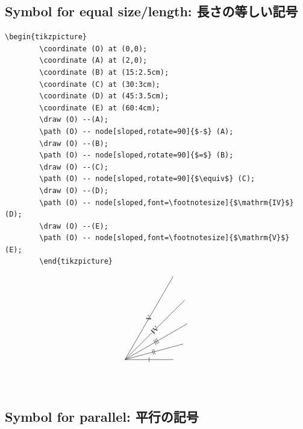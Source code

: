 \documentclass[lualatex]{jlreq}
\begin{document}
\subsection{Symbol for equal size/length: 長さの等しい記号}

\begin{minipage}{0.68 \textwidth}
    \begin{lstlisting}[language={[LaTeX] TeX},
        firstnumber=1,breaklines=true,gobble=8]
        \begin{tikzpicture}
        \coordinate (O) at (0,0);
        \coordinate (A) at (2,0);
        \coordinate (B) at (15:2.5cm);
        \coordinate (C) at (30:3cm);
        \coordinate (D) at (45:3.5cm);
        \coordinate (E) at (60:4cm);
        \draw (O) --(A);
        \path (O) -- node[sloped,rotate=90]{$-$} (A);
        \draw (O) --(B);
        \path (O) -- node[sloped,rotate=90]{$=$} (B);
        \draw (O) --(C);
        \path (O) -- node[sloped,rotate=90]{$\equiv$} (C);
        \draw (O) --(D);
        \path (O) -- node[sloped,font=\footnotesize]{$\mathrm{IV}$} (D);
        \draw (O) --(E);
        \path (O) -- node[sloped,font=\footnotesize]{$\mathrm{V}$} (E);
        \end{tikzpicture}
\end{lstlisting}
\end{minipage}
\hfill
\begin{minipage}{0.28 \textwidth}
    \[
        \begin{tikzpicture}
        \coordinate (O) at (0,0);
        \coordinate (A) at (2,0);
        \coordinate (B) at (15:2.5cm);
        \coordinate (C) at (30:3cm);
        \coordinate (D) at (45:3.5cm);
        \coordinate (E) at (60:4cm);
        \draw (O) --(A);
        \path (O) -- node[sloped,rotate=90]{$-$} (A);
        \draw (O) --(B);
        \path (O) -- node[sloped,rotate=90]{$=$} (B);
        \draw (O) --(C);
        \path (O) -- node[sloped,rotate=90]{$\equiv$} (C);
        \draw (O) --(D);
        \path (O) -- node[sloped,font=\footnotesize]{$\mathrm{IV}$} (D);
        \draw (O) --(E);
        \path (O) -- node[sloped,font=\footnotesize]{$\mathrm{V}$} (E);
        \end{tikzpicture}
    \]
\end{minipage}
\\[1em]

\subsection{Symbol for parallel: 平行の記号}
\end{document}
